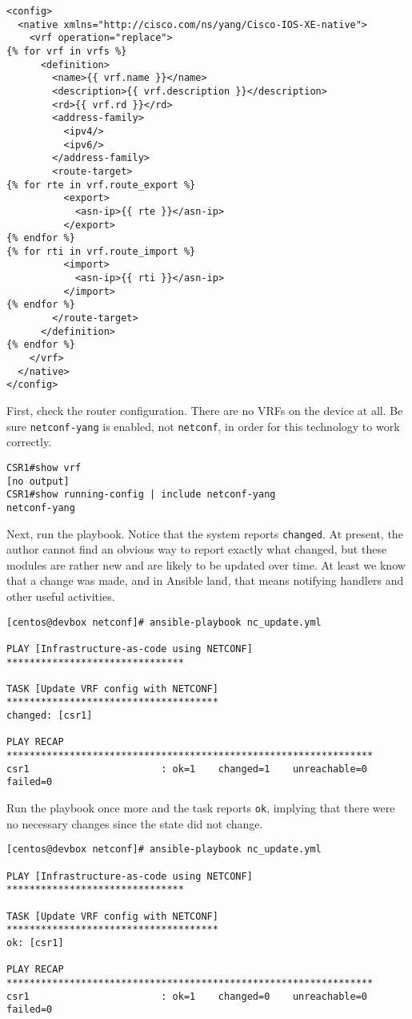 \begin{verbatim}
<config>
  <native xmlns="http://cisco.com/ns/yang/Cisco-IOS-XE-native">
    <vrf operation="replace">
{% for vrf in vrfs %}
      <definition>
        <name>{{ vrf.name }}</name>
        <description>{{ vrf.description }}</description>
        <rd>{{ vrf.rd }}</rd>
        <address-family>
          <ipv4/>
          <ipv6/>
        </address-family>
        <route-target>
{% for rte in vrf.route_export %}
          <export>
            <asn-ip>{{ rte }}</asn-ip>
          </export>
{% endfor %}
{% for rti in vrf.route_import %}
          <import>
            <asn-ip>{{ rti }}</asn-ip>
          </import>
{% endfor %}
        </route-target>
      </definition>
{% endfor %}
    </vrf>
  </native>
</config>
\end{verbatim}

First, check the router configuration. There are no VRFs on the device at all.
Be sure \verb|netconf-yang| is enabled, not \verb|netconf|, in order for
this technology to work correctly.

\begin{verbatim}
CSR1#show vrf
[no output]
CSR1#show running-config | include netconf-yang
netconf-yang
\end{verbatim}

Next, run the playbook. Notice that the system reports \verb|changed|. At present,
the author cannot find an obvious way to report exactly what changed, but these
modules are rather new and are likely to be updated over time. At least we know
that a change was made, and in Ansible land, that means notifying handlers and
other useful activities.

\begin{verbatim}
[centos@devbox netconf]# ansible-playbook nc_update.yml

PLAY [Infrastructure-as-code using NETCONF] *******************************

TASK [Update VRF config with NETCONF] *************************************
changed: [csr1]

PLAY RECAP ****************************************************************
csr1                       : ok=1    changed=1    unreachable=0    failed=0
\end{verbatim}

Run the playbook once more and the task reports \verb|ok|, implying that there
were no necessary changes since the state did not change.

\begin{verbatim}
[centos@devbox netconf]# ansible-playbook nc_update.yml

PLAY [Infrastructure-as-code using NETCONF] *******************************

TASK [Update VRF config with NETCONF] *************************************
ok: [csr1]

PLAY RECAP ****************************************************************
csr1                       : ok=1    changed=0    unreachable=0    failed=0
\end{verbatim}

